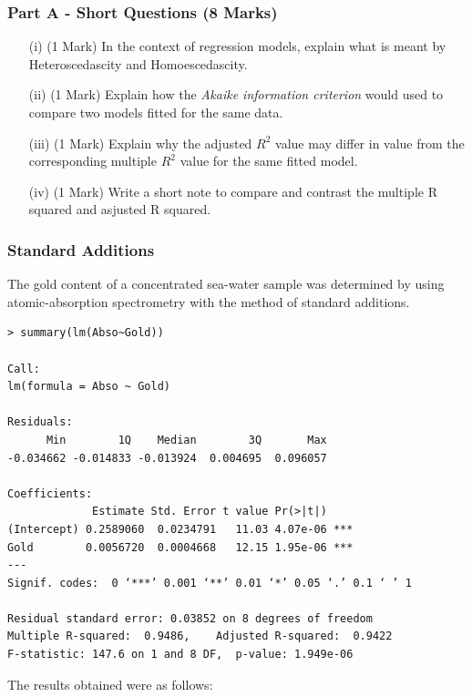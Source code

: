\documentclass[a4paper,12pt]{article}
\begin{document}
\subsubsection*{Part A - Short Questions (8 Marks)}	
	\begin{itemize}
		\item[(i)] (1 Mark) In the context of regression models, explain what is meant by Heteroscedascity and Homoescedascity.
		
		
		\item[(ii)] (1 Mark)  Explain how the \emph{Akaike information criterion} would used to compare two models fitted for the same data.
		\item[(iii)] (1 Mark) Explain why the adjusted $R^2$ value may differ in value from the corresponding multiple $R^2$ value for the same fitted model.
		\item[(iv)] (1 Mark) Write a short note to compare and contrast the multiple R squared and asjusted R squared.
		
	\end{itemize}
	
\subsubsection*{Standard Additions}	
The gold content of a concentrated sea-water sample was determined by using
atomic-absorption spectrometry with the method of standard additions.
\begin{framed}
\begin{verbatim}
> summary(lm(Abso~Gold))

Call:
lm(formula = Abso ~ Gold)

Residuals:
      Min        1Q    Median        3Q       Max 
-0.034662 -0.014833 -0.013924  0.004695  0.096057 

Coefficients:
             Estimate Std. Error t value Pr(>|t|)    
(Intercept) 0.2589060  0.0234791   11.03 4.07e-06 ***
Gold        0.0056720  0.0004668   12.15 1.95e-06 ***
---
Signif. codes:  0 ‘***’ 0.001 ‘**’ 0.01 ‘*’ 0.05 ‘.’ 0.1 ‘ ’ 1

Residual standard error: 0.03852 on 8 degrees of freedom
Multiple R-squared:  0.9486,    Adjusted R-squared:  0.9422 
F-statistic: 147.6 on 1 and 8 DF,  p-value: 1.949e-06

\end{verbatim}
\end{framed}
The results obtained were as follows:
\end{document}
